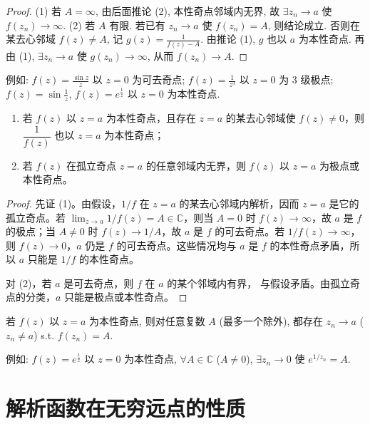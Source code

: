 \documentclass[theorem=false,mathfont=none,openany,sub3section]{easybook}
\begin{document}
\begin{proof}
  (1) 若 $A=\infty$, 由后面推论 (2), 本性奇点邻域内无界, 故 $\exists z_{n}\to a$ 使 $f(z_{n})\to\infty$.
  (2) 若 $A$ 有限. 若已有 $z_{n}\to a$ 使 $f(z_{n})=A$, 则结论成立. 否则在某去心邻域 $f(z)\neq A$, 记 $g(z)=\frac{1}{f(z)-A}$. 由推论 (1), $g$ 也以 $a$ 为本性奇点. 再由 (1), $\exists z_{n}\to a$ 使 $g(z_{n})\to\infty$, 从而 $f(z_{n})\to A$.
\end{proof}

例如: $f(z)=\frac{\sin z}{z}$ 以 $z=0$ 为可去奇点; $f(z)=\frac{1}{z^{3}}$ 以 $z=0$ 为 3 级极点; $f(z)=\sin\frac{1}{z}$, $f(z)=e^{\frac{1}{z}}$ 以 $z=0$ 为本性奇点.

\begin{corollary}
  \begin{enumerate}
    \item 若 $f(z)$ 以 $z=a$ 为本性奇点，且存在 $z=a$ 的某去心邻域使
    $f(z)\neq0$，则 $\dfrac{1}{f(z)}$ 也以 $z=a$ 为本性奇点；
    \item 若 $f(z)$ 在孤立奇点 $z=a$ 的任意邻域内无界，则 $f(z)$ 以
    $z=a$ 为极点或本性奇点。
  \end{enumerate}
\end{corollary}
\begin{proof}
  先证 (1)。由假设，$1/f$ 在 $z=a$ 的某去心邻域内解析，因而
  $z=a$ 是它的孤立奇点。若
  $\lim_{z\to a}1/f(z)=A\in\mathbb{C}$，则当 $A=0$ 时
  $f(z)\to\infty$，故 $a$ 是 $f$ 的极点；当 $A\neq0$ 时
  $f(z)\to1/A$，故 $a$ 是 $f$ 的可去奇点。若 $1/f(z)\to\infty$，
  则 $f(z)\to0$，$a$ 仍是 $f$ 的可去奇点。这些情况均与 $a$ 是
  $f$ 的本性奇点矛盾，所以 $a$ 只能是 $1/f$ 的本性奇点。

  对 (2)，若 $a$ 是可去奇点，则 $f$ 在 $a$ 的某个邻域内有界，
  与假设矛盾。由孤立奇点的分类，$a$ 只能是极点或本性奇点。
\end{proof}

\begin{theorem}[Picard 定理]
  若 $f(z)$ 以 $z=a$ 为本性奇点, 则对任意复数 $A$ (最多一个除外), 都存在 $z_{n}\to a$ ($z_{n}\neq a$) s.t. $f(z_{n})=A$.
\end{theorem}

例如: $f(z)=e^{\frac{1}{z}}$ 以 $z=0$ 为本性奇点, $\forall A\in\mathbb{C}$ ($A\neq0$), $\exists z_{n}\to0$ 使 $e^{1/z_{n}}=A$.

\newpage

\section{解析函数在无穷远点的性质}
\end{document}

